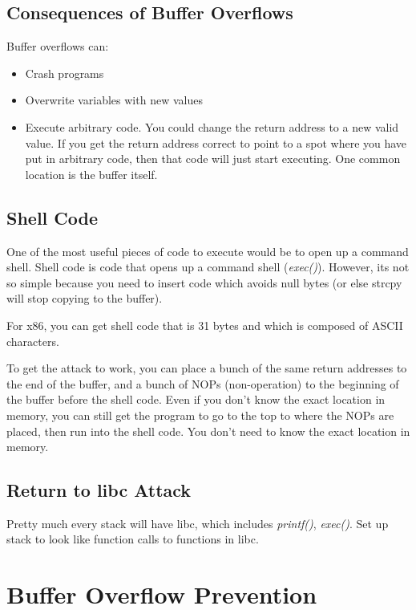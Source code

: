 \documentclass[psamsfonts]{amsart}
\begin{document}
\subsection{Consequences of Buffer Overflows}

Buffer overflows can:
\begin{itemize}
  \item Crash programs
  \item Overwrite variables with new values
  \item Execute arbitrary code. You could change the return address to a new valid value. If you get the return address correct to point to a spot where you have put in arbitrary code, then that code will just start executing. One common location is the buffer itself.
\end{itemize}

\subsection{Shell Code}

One of the most useful pieces of code to execute would be to open up a command shell. Shell code is code that opens up a command shell (\emph{exec()}). However, its not so simple because you need to insert code which avoids null bytes (or else strcpy will stop copying to the buffer).

For x86, you can get shell code that is 31 bytes and which is composed of ASCII characters.

To get the attack to work, you can place a bunch of the same return addresses to the end of the buffer, and a bunch of NOPs (non-operation) to the beginning of the buffer before the shell code. Even if you don't know the exact location in memory, you can still get the program to go to the top to where the NOPs are placed, then run into the shell code. You don't need to know the exact location in memory.

\subsection{Return to libc Attack}

Pretty much every stack will have libc, which includes \emph{printf()}, \emph{exec()}. Set up stack to look like function calls to functions in libc.

\section{Buffer Overflow Prevention}
\end{document}
